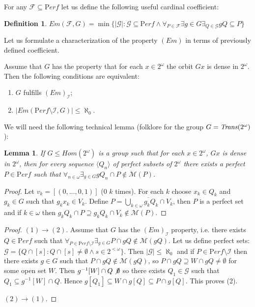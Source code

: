 \documentclass[b5cutpaper, twoside, 11pt, leqno]{moravica}
\newcommand\trans{{\it Trans}(\ca)}
\newcommand{\ca}{2^{\omega}}
\newcommand{\cantor}{\ca}
\newcommand{\Perf}{{\mathrm Perf}}
\newcommand{\calF}{{\mathcal{F}}}
\newcommand{\cF}{\calF}
\newcommand{\calG}{{\mathcal G}}
\newcommand{\cG}{\calG}
\newcommand{\calI}{{\mathcal{I}}}
\newcommand{\meager}{\mathcal{M}}
\newtheorem{lemma}{Lemma}[section]
\theoremstyle{definition}
\newtheorem{definition}{Definition}[section]
\begin{document}
  For any $\cF \subseteq \Perf$ 
let us define the following useful cardinal coefficient:
\begin{definition}
$Em(\cF, G) = \min\{|\cG|\colon \cG\subseteq \Perf \wedge 
\forall_{P\in\cF} \exists{g\in G} \exists_{Q\in\cG} gQ \subseteq P\}$
\end{definition}

  Let us formulate a characterization of the property 
$(Em)$ in terms of previously defined coefficient.

Assume that $G$ has the property that for each $x\in\cantor$
the orbit $Gx$ is dense in $\cantor$.
Then the following conditions are equivalent:

\begin{enumerate}
\item
  $G$ fulfills $(Em)_{\calI}$; 
\item
  $|Em(\Perf\setminus \calI, G) | \leq \aleph_0$.
\end{enumerate}

  We will need the following technical lemma
(folklore for the group $G = \trans$):
\begin{lemma}\label{lemma-dense}
If $G\leq Hom(\cantor)$ is a group such that for each 
$x\in\cantor$, $Gx$ is dense in $\cantor$,
then for every sequence $\langle Q_n\rangle$
of perfect subsets of $\cantor$ there exists
a perfect $P\in\Perf$ such that 
$\forall_{n\in\omega} \exists_{g\in G} gQ_n \cap P 
\not \in \meager(P)$.
\end{lemma}
\begin{proof}
Let $v_k = [(0,\ldots,0, 1)]$ ($0$ $k$ times).
For each $k$ choose $x_k\in Q_k$ and $g_k\in G$
such that $g_k x_k \in V_k$. Define
$P = \overline{\bigcup_{k\in\omega}g_k Q_k \cap V_k}$,
then $P$ is a perfect set and if $k\in\omega$
then 
$g_k Q_k \cap P \supseteq g_k Q_k \cap V_k \not\in \meager(P)$.
\end{proof}

\begin{proof}%
$(1)\to (2)$.
Assume that $G$ has the $(Em)_\calI$ property,
i.e. there exists $Q\in\Perf$ such that
$\forall_{P\in\Perf\setminus\calI}\exists_{g\in G} 
P\cap gQ\not\in \meager(gQ)$. 
Let us define perfect sets:
$\cG = \{Q \cap [s] \colon Q \cap [s] \not= \emptyset \wedge
s\in 2^{<\omega}\}$.
Then $|\cG| \leq \aleph_0$ and if $P\in\Perf\setminus\calI$
then there exists $g\in G$ such that
$P\cap gQ \not\in\meager(gQ)$, so
$P\cap gQ \supseteq W\cap gQ \not= \emptyset$
for some open set $W$.
Then $g^{-1}[W] \cap Q \not\emptyset$
so there exists $Q_1\in \cG$ such that
$Q_1 \subseteq g^{-1}[W] \cap Q$.
Hence $g[Q_1] \subseteq W \cap g[Q] \subseteq P \cap g[Q]$.
This proves (2).

$(2)\to(1)$.

\end{proof}
\end{document}
